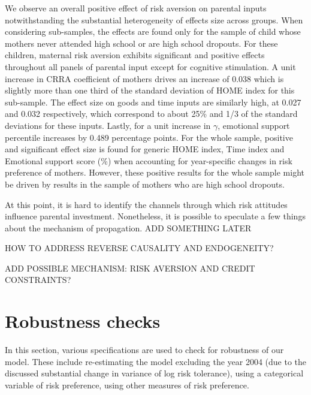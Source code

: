 \documentclass[]{article}
\begin{document}
We observe an overall positive effect of risk aversion on parental inputs notwithstanding the substantial heterogeneity of effects size across groups. When considering sub-samples, the effects are found only for the sample of child whose mothers never attended high school or are high school dropouts. For these children, maternal risk aversion exhibits significant and positive effects throughout all panels of parental input except for cognitive stimulation. A unit increase in CRRA coefficient of mothers drives an increase of 0.038 which is slightly more than one third of the standard deviation of HOME index for this sub-sample. The effect size on goods and time inputs are similarly high, at 0.027 and 0.032 respectively, which correspond to about 25\% and 1/3 of the standard deviations for these inputs. Lastly, for a unit increase in $\gamma$, emotional support percentile increases by 0.489 percentage points. For the whole sample, positive and significant effect size is found for generic HOME index, Time index and Emotional support score (\%) when accounting for year-specific changes in risk preference of mothers. However, these positive results for the whole sample might be driven by results in the sample of mothers who are high school dropouts. 

At this point, it is hard to identify the channels through which risk attitudes influence parental investment. Nonetheless, it is possible to speculate a few things about the mechanism of propagation.    ADD SOMETHING LATER

HOW TO ADDRESS REVERSE CAUSALITY AND ENDOGENEITY?


ADD POSSIBLE MECHANISM: RISK AVERSION AND CREDIT CONSTRAINTS?




\section{Robustness checks}
In this section, various specifications are used to check for robustness of our model. These include re-estimating the model excluding the year 2004 (due to the discussed substantial change in variance of log risk tolerance), using a categorical variable of risk preference, using other measures of risk preference.
\end{document}
